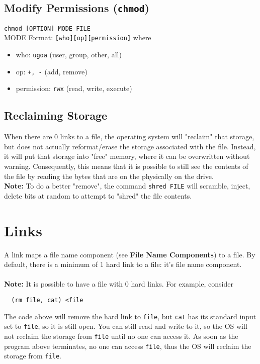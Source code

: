 \documentclass[13pt]{article}
\begin{document}
    \subsection{Modify Permissions (\texttt{chmod})}
    \texttt{chmod [OPTION] MODE FILE} \\
    MODE Format: \texttt{[who][op][permission]} where
    \begin{itemize}[leftmargin = 0pt]
    \item [] who: \texttt{ugoa} (user, group, other, all)
    \item [] op: \texttt{+, -} (add, remove)
    \item [] permission: \texttt{rwx} (read, write, execute)
    \end{itemize}

    \subsection{Reclaiming Storage}
    When there are 0 links to a file, the operating system will "reclaim" that storage, but does not actually reformat/erase the storage associated with the file. Instead, it will put that storage into "free" memory, where it can be overwritten without warning. Consequently, this means that it is possible to still see the contents of the file by reading the bytes that are on the physically on the drive. \\
    \textbf{Note:} To do a better "remove", the command \texttt{shred FILE} will scramble, inject, delete bits at random to attempt to "shred" the file contents.

    \section{Links}
    A link maps a file name component (see \textbf{File Name Components}) to a file. By default, there is a minimum of 1 hard link to a file: it's file name component. \\ \\
    \textbf{Note:} It is possible to have a file with 0 hard links. For example, consider
\begin{verbatim}
  (rm file, cat) <file \end{verbatim}
The code above will remove the hard link to \texttt{file}, but \texttt{cat} has its standard input set to \texttt{file}, so it is still open. You can still read and write to it, so the OS will not reclaim the storage from \texttt{file} until no one can access it. As soon as the program above terminates, no one can access \texttt{file}, thus the OS will reclaim the storage from \texttt{file}.
\end{document}
